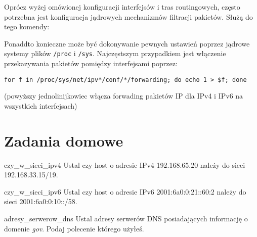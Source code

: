 \documentclass{pdfBooklets}
\begin{document}
Oprócz wyżej omówionej konfiguracji interfejsów i tras routingowych, często potrzebna jest konfiguracja jądrowych mechanizmów filtracji pakietów. Służą do tego komendy:

Ponaddto konieczne może być dokonywanie pewnych ustawień poprzez jądrowe systemy plików \Verb$/proc$ i \Verb$/sys$.
Najczęstszym przypadkiem jest włączenie przekazywania pakietów pomiędzy interfejsami poprzez:

\begin{verbatim}
for f in /proc/sys/net/ipv*/conf/*/forwarding; do echo 1 > $f; done
\end{verbatim}
(powyższy jednolinijkowiec włącza forwading pakietów IP dla IPv4 i IPv6 na wszystkich interfejsach)

\section{Zadania domowe}

\begin{Zadanie}{}{czy_w_sieci_ipv4} %
Ustal czy host o adresie IPv4 192.168.65.20 należy do sieci 192.168.33.15/19.
\end{Zadanie}


\begin{Zadanie}{}{czy_w_sieci_ipv6} %
Ustal czy host o adresie IPv6 2001:6a0:0:21::60:2 należy do sieci 2001:6a0:0:10::/58.
\end{Zadanie}


\begin{Zadanie}{}{adresy_serwerow_dns} %
Ustal adresy serwerów DNS posiadających informację o domenie \emph{gov}. Podaj polecenie którego użyłeś.
\end{Zadanie}
\end{document}
